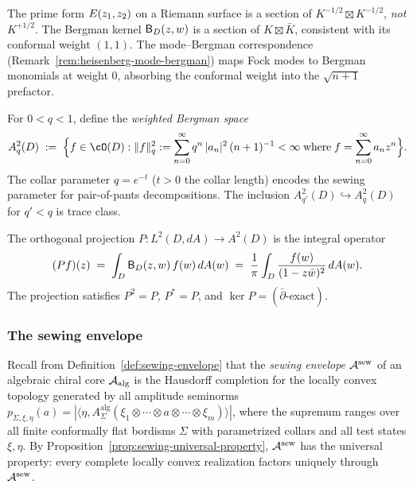 \begin{remark}%
\label{rem:thqg-X-bergman-conformal}%
The prime form $E(z_1,z_2)$ on a Riemann surface is a section
of $K^{-1/2} \boxtimes K^{-1/2}$, \emph{not} $K^{+1/2}$.
The Bergman kernel
$\mathsf{B}_D(z,w)$ is a section of $K \boxtimes \bar{K}$, consistent
with its conformal weight $(1,1)$. The mode--Bergman correspondence
(Remark~\ref{rem:heisenberg-mode-bergman}) maps Fock modes to
Bergman monomials at weight $0$, absorbing the conformal weight
into the $\sqrt{n+1}$ prefactor.
\end{remark}

\begin{definition}%
\label{def:thqg-X-bergman-collar}%
%
For $0 < q < 1$, define the \emph{weighted Bergman space}
\begin{equation}\label{eq:thqg-X-bergman-weighted}
A^2_q(D)
\;:=\;
\Bigl\{f \in \cO(D) :
\|f\|^2_{q} := \sum_{n=0}^{\infty}
q^n \,|a_n|^2 \,(n+1)^{-1} < \infty
\;\text{where}\; f = \sum_{n=0}^{\infty} a_n z^n\Bigr\}.
\end{equation}
The collar parameter $q = e^{-t}$ ($t > 0$ the collar length)
encodes the sewing parameter for pair-of-pants decompositions.
The inclusion $A^2_{q'}(D) \hookrightarrow A^2_q(D)$ for $q' < q$
is trace class.
\end{definition}

\begin{lemma}%
\label{lem:thqg-X-bergman-projection}%
%
The orthogonal projection
$P \colon L^2(D, dA) \to A^2(D)$ is the integral operator
\[
(Pf)(z)
\;=\;
\int_D \mathsf{B}_D(z,w)\,f(w)\,dA(w)
\;=\;
\frac{1}{\pi}\int_D \frac{f(w)}{(1-z\bar{w})^2}\,dA(w).
\]
The projection satisfies $P^2 = P$, $P^* = P$, and
$\ker P = (\bar{\partial}\text{-exact})$.
\end{lemma}

\subsubsection{The sewing envelope}

\begin{definition}%
\label{def:thqg-X-sewing-envelope-review}%
%
Recall from Definition~\ref{def:sewing-envelope} that
the \emph{sewing envelope} $\mathcal{A}^{\mathrm{sew}}$ of an algebraic chiral
core $\mathcal{A}_{\mathrm{alg}}$ is the Hausdorff completion
for the locally convex topology generated by all amplitude
seminorms $p_{\Sigma,\xi,\eta}(a)
= |\langle \eta, A_\Sigma^{\mathrm{alg}}(\xi_1 \otimes \cdots
\otimes a \otimes \cdots \otimes \xi_m)\rangle|$,
where the supremum ranges over all finite conformally flat
bordisms $\Sigma$ with parametrized collars and all
test states $\xi, \eta$. By Proposition~\ref{prop:sewing-universal-property},
$\mathcal{A}^{\mathrm{sew}}$ has the universal property: every complete locally convex
realization factors uniquely through~$\mathcal{A}^{\mathrm{sew}}$.
\end{definition}

